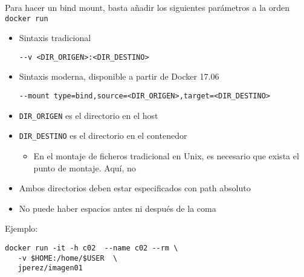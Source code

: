 \documentclass[ucs]{beamer}
\begin{document}
\begin{frame}[fragile]
\frametitle{}


Para hacer un bind mount, basta añadir los siguientes parámetros
a la orden \verb|docker run|


\begin{itemize}
\item
Sintaxis tradicional

\verb|--v <DIR_ORIGEN>:<DIR_DESTINO>|

\item
Sintaxis moderna, disponible a partir de Docker 17.06

\verb|--mount type=bind,source=<DIR_ORIGEN>,target=<DIR_DESTINO>|
\end{itemize}

\begin{itemize}
\item
\verb|DIR_ORIGEN| es el directorio en el host

\item
\verb|DIR_DESTINO| es el directorio en el contenedor

\begin{itemize}
\item
En el montaje de ficheros tradicional en Unix, es necesario que exista
el punto de montaje. Aquí, no
\end{itemize}

\item
Ambos directorios deben estar especificados con path absoluto

\item
No puede haber espacios antes ni después de la coma
\end{itemize}


Ejemplo:


  \begin{scriptsize}
  \begin{verbatim}
docker run -it -h c02  --name c02 --rm \
   -v $HOME:/home/$USER  \
   jperez/imagen01
  \end{verbatim}
  \end{scriptsize}

\end{frame}
\end{document}
